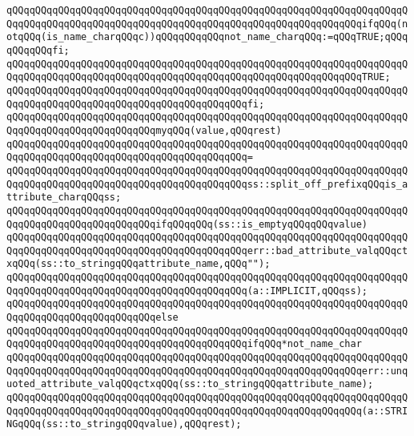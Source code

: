 \verb|qQQqqQQqqQQqqQQqqQQqqQQqqQQqqQQqqQQqqQQqqQQqqQQqqQQqqQQqqQQqqQQqqQQqqQQqqQQqqQQqqQQqqQQqqQQqqQQqqQQqqQQqqQQqqQQqqQQqqQQqqQQqqQQqqQQqifqQQq(notqQQq(is_name_charqQQqc))qQQqqQQqqQQqnot_name_charqQQq:=qQQqTRUE;qQQqqQQqqQQqfi;|\newline
\verb|qQQqqQQqqQQqqQQqqQQqqQQqqQQqqQQqqQQqqQQqqQQqqQQqqQQqqQQqqQQqqQQqqQQqqQQqqQQqqQQqqQQqqQQqqQQqqQQqqQQqqQQqqQQqqQQqqQQqqQQqqQQqqQQqqQQqTRUE;|\newline
\verb|qQQqqQQqqQQqqQQqqQQqqQQqqQQqqQQqqQQqqQQqqQQqqQQqqQQqqQQqqQQqqQQqqQQqqQQqqQQqqQQqqQQqqQQqqQQqqQQqqQQqqQQqqQQqqQQqfi;|\newline
\newline
\verb|qQQqqQQqqQQqqQQqqQQqqQQqqQQqqQQqqQQqqQQqqQQqqQQqqQQqqQQqqQQqqQQqqQQqqQQqqQQqqQQqqQQqqQQqqQQqqQQqmyqQQq(value,qQQqrest)|\newline
\verb|qQQqqQQqqQQqqQQqqQQqqQQqqQQqqQQqqQQqqQQqqQQqqQQqqQQqqQQqqQQqqQQqqQQqqQQqqQQqqQQqqQQqqQQqqQQqqQQqqQQqqQQqqQQqqQQq=|\newline
\verb|qQQqqQQqqQQqqQQqqQQqqQQqqQQqqQQqqQQqqQQqqQQqqQQqqQQqqQQqqQQqqQQqqQQqqQQqqQQqqQQqqQQqqQQqqQQqqQQqqQQqqQQqqQQqqQQqss::split_off_prefixqQQqis_attribute_charqQQqss;|\newline
\newline
\verb|qQQqqQQqqQQqqQQqqQQqqQQqqQQqqQQqqQQqqQQqqQQqqQQqqQQqqQQqqQQqqQQqqQQqqQQqqQQqqQQqqQQqqQQqqQQqqQQqifqQQqqQQq(ss::is_emptyqQQqqQQqvalue)|\newline
\newline
\verb|qQQqqQQqqQQqqQQqqQQqqQQqqQQqqQQqqQQqqQQqqQQqqQQqqQQqqQQqqQQqqQQqqQQqqQQqqQQqqQQqqQQqqQQqqQQqqQQqqQQqqQQqqQQqqQQqerr::bad_attribute_valqQQqctxqQQq(ss::to_stringqQQqattribute_name,qQQq"");|\newline
\verb|qQQqqQQqqQQqqQQqqQQqqQQqqQQqqQQqqQQqqQQqqQQqqQQqqQQqqQQqqQQqqQQqqQQqqQQqqQQqqQQqqQQqqQQqqQQqqQQqqQQqqQQqqQQqqQQq(a::IMPLICIT,qQQqss);|\newline
\verb|qQQqqQQqqQQqqQQqqQQqqQQqqQQqqQQqqQQqqQQqqQQqqQQqqQQqqQQqqQQqqQQqqQQqqQQqqQQqqQQqqQQqqQQqqQQqqQQqelse|\newline
\verb|qQQqqQQqqQQqqQQqqQQqqQQqqQQqqQQqqQQqqQQqqQQqqQQqqQQqqQQqqQQqqQQqqQQqqQQqqQQqqQQqqQQqqQQqqQQqqQQqqQQqqQQqqQQqqQQqifqQQq*not_name_char|\newline
\verb|qQQqqQQqqQQqqQQqqQQqqQQqqQQqqQQqqQQqqQQqqQQqqQQqqQQqqQQqqQQqqQQqqQQqqQQqqQQqqQQqqQQqqQQqqQQqqQQqqQQqqQQqqQQqqQQqqQQqqQQqqQQqqQQqqQQqerr::unquoted_attribute_valqQQqctxqQQq(ss::to_stringqQQqattribute_name);|\newline
\verb|qQQqqQQqqQQqqQQqqQQqqQQqqQQqqQQqqQQqqQQqqQQqqQQqqQQqqQQqqQQqqQQqqQQqqQQqqQQqqQQqqQQqqQQqqQQqqQQqqQQqqQQqqQQqqQQqqQQqqQQqqQQqqQQqqQQq(a::STRINGqQQq(ss::to_stringqQQqvalue),qQQqrest);|\newline
